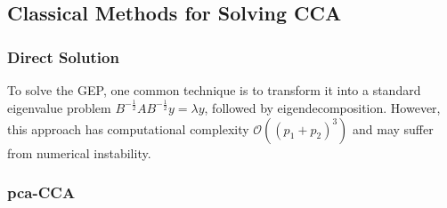 
\subsection{Classical Methods for Solving CCA}

\subsubsection{Direct Solution}

To solve the GEP, one common technique is to transform it into a standard eigenvalue problem \( B^{-\frac{1}{2}} A B^{-\frac{1}{2}} y = \lambda y \), followed by eigendecomposition.
However, this approach has computational complexity \( \mathcal{O}((p_1+p_2)^3) \) and may suffer from numerical instability.

\subsubsection{\acrshort{pca}-CCA}

